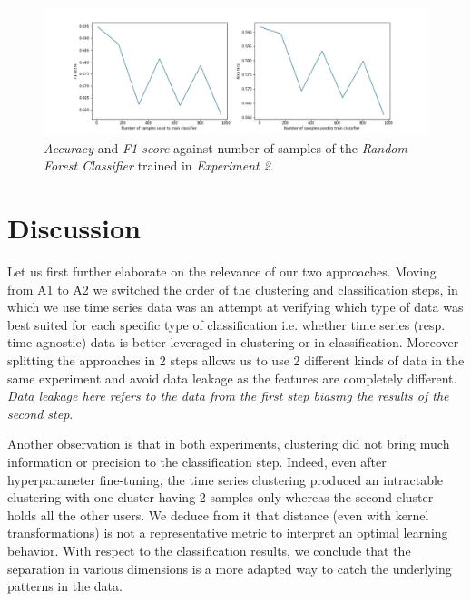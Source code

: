 \documentclass[sigplan,screen]{acmart}
\begin{document}
  \begin{figure}[h]
     \centering
     \includegraphics[width=\linewidth]{reports/figures/results_rf_2.jpg}
     \caption{\emph{Accuracy} and \emph{F1-score} against number of samples of the \emph{Random Forest Classifier} trained in \emph{Experiment 2}.}
     \label{fig:results_rf_2}
 \end{figure}

\section{Discussion}\label{sec:discussion}


Let us first further elaborate on the relevance of our two approaches. Moving from A1 to A2 we switched the order of the clustering and classification steps, in which we use time series data was an attempt at verifying which type of data was best suited for each specific type of classification i.e. whether time series (resp. time agnostic) data is better leveraged in clustering or in classification. Moreover splitting the approaches in 2 steps allows us to use 2 different kinds of data in the same experiment and avoid data leakage as the features are completely different. \textit{Data leakage here refers to the data from the first step biasing the results of the second step}.

Another observation is that in both experiments, clustering did not bring much information or precision to the classification step. Indeed, even after hyperparameter fine-tuning, the time series clustering produced an intractable clustering with one cluster having 2 samples only whereas the second cluster holds all the other users. We deduce from it that distance (even with kernel transformations) is not a representative metric to interpret an optimal learning behavior. With respect to the classification results, we conclude that the separation in various dimensions is a more adapted way to catch the underlying patterns in the data.
\end{document}
